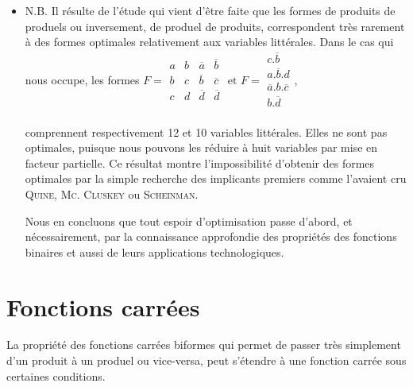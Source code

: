 \begin{itemize}
\item N.B. Il résulte de l'étude qui vient d'être faite que les formes de produits de produels ou inversement, de produel de produits, correspondent très rarement à des formes optimales relativement aux variables littérales. Dans le cas qui nous occupe, les formes $ F = \begin{array}{|c|c|c|c|}  a & b & \overline{a} & \overline{b} \\
                          b & c & \overline{b} & \overline{c} \\
                          c & d & \overline{d} & \overline{d} \\
                         \end{array}  
                         \text{ et }  F = \begin{array}{|c|} c . \overline{b} \\
                                          a . \overline{b} . d \\
                                          \overline{a} . b . \overline{c} \\
                                          b . \overline{d} \\
                                          \end{array}$, 
                                          
comprennent respectivement 12 et 10 variables littérales. Elles ne sont pas optimales, puisque nous pouvons les réduire à huit variables par mise en facteur partielle. Ce résultat montre l'impossibilité d'obtenir des formes optimales par la simple recherche des implicants premiers comme l'avaient cru \textsc{Quine}, \textsc{Mc. Cluskey} ou \textsc{Scheinman}.                                       

Nous en concluons que tout espoir d'optimisation passe d'abord, et nécessairement, par la connaissance approfondie des propriétés des fonctions binaires et aussi de leurs applications technologiques.
\end{itemize}


\section{Fonctions carrées}




La propriété des fonctions carrées biformes qui permet de passer très simplement d'un produit à un produel ou vice-versa, peut s'étendre à une fonction carrée sous certaines conditions. 

